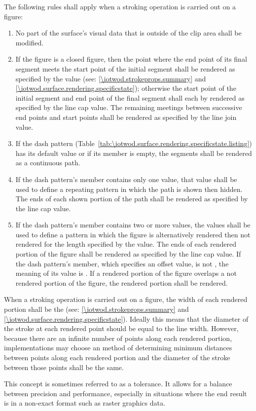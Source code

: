 \pnum
The following rules shall apply when a stroking operation is carried out on a figure:
\begin{enumerate}
\item No part of the surface's visual data that is outside of the clip area shall be modified.

\item If the figure is a closed figure, then the point where the end point of its final segment meets the start point of the initial segment shall be rendered as specified by the  value (see: \ref{\iotwod.strokeprops.summary} and \ref{\iotwod.surface.rendering.specificstate}); otherwise the start point of the initial segment and end point of the final segment shall each by rendered as specified by the line cap value. The remaining meetings between successive end points and start points shall be rendered as specified by the line join value.

\item If the dash pattern (Table~\ref{tab:\iotwod.surface.rendering.specificstate.listing}) has its default value or if its  member is empty, the segments shall be rendered as a continuous path.

\item If the dash pattern's  member contains only one value, that value shall be used to define a repeating pattern in which the path is shown then hidden. The ends of each shown portion of the path shall be rendered as specified by the line cap value.

\item If the dash pattern's  member contains two or more values, the values shall be used to define a pattern in which the figure is alternatively rendered then not rendered for the length specified by the value. The ends of each rendered portion of the figure shall be rendered as specified by the line cap value. If the dash pattern's  member, which specifies an offset value, is not , the meaning of its value is . If a rendered portion of the figure overlaps a not rendered portion of the figure, the rendered portion shall be rendered.
\end{enumerate}

\pnum
When a stroking operation is carried out on a figure, the width of each rendered portion shall be the  (see: \ref{\iotwod.strokeprops.summary} and \ref{\iotwod.surface.rendering.specificstate}). Ideally this means that the diameter of the stroke at each rendered point should be equal to the line width. However, because there are an infinite number of points along each rendered portion, implementations may choose an \unspecnorm method of determining minimum distances between points along each rendered portion and the diameter of the stroke between those points shall be the same.
\begin{note}
This concept is sometimes referred to as a tolerance. It allows for a balance between precision and performance, especially in situations where the end result is in a non-exact format such as raster graphics data.
\end{note}

